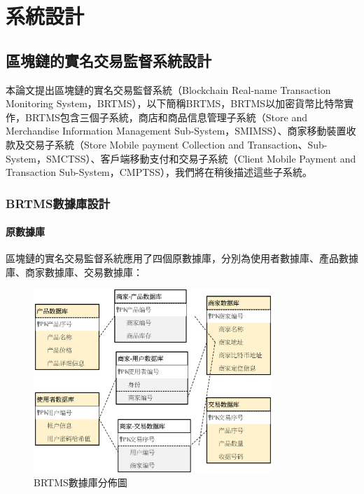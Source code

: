 \chapter{系統設計}

\section{區塊鏈的實名交易監督系統設計}

本論文提出區塊鏈的實名交易監督系統（Blockchain Real-name Transaction Monitoring System，BRTMS），以下簡稱BRTMS，BRTMS以加密貨幣比特幣實作，BRTMS包含三個子系統，商店和商品信息管理子系統（Store and Merchandise Information Management Sub-System，SMIMSS）、商家移動裝置收款及交易子系統（Store Mobile payment Collection and Transaction、Sub-System，SMCTSS）、客戶端移動支付和交易子系統（Client Mobile Payment and Transaction Sub-System，CMPTSS），我們將在稍後描述這些子系統。

	\subsection{BRTMS數據庫設計}

		\subsubsection{原數據庫}
		區塊鏈的實名交易監督系統應用了四個原數據庫，分別為使用者數據庫、產品數據庫、商家數據庫、交易數據庫：

		\begin{figure}[htbp]
			\centering
			\includegraphics[width = 0.8\textwidth]{db.png}
			\caption{BRTMS數據庫分佈圖}\label{db}
		\end{figure}

